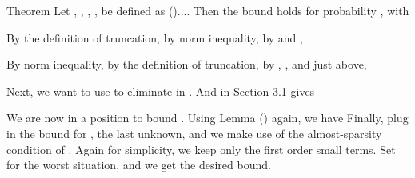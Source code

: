 \Result
{Theorem}
{
Let , , , ,  be defined as ()....
Then the bound
holds for probability , with
}

By the definition of truncation, by  norm inequality, by  and ,

By  norm inequality, by the definition of truncation, by , , and  just above,


Next, we want to use  to eliminate  in .
And  in Section 3.1 gives

We are now in a position to bound .
Using Lemma () again, we have
Finally, plug in the bound for , the last unknown, and we make use of the almost-sparsity condition of .
Again for simplicity, we keep only the first order small terms.
Set  for the worst situation, and we get the desired bound.

\stopsubsection
\stopsection


